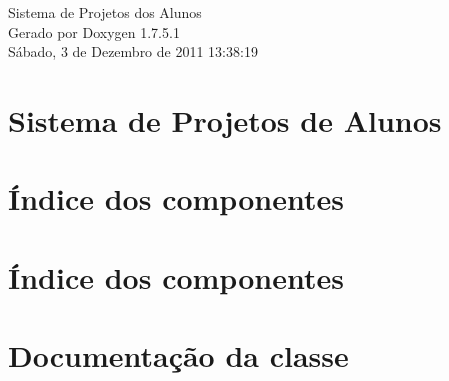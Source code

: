 \documentclass[a4paper]{book}
\begin{document}
\hypersetup{pageanchor=false,citecolor=blue}
\begin{titlepage}
\vspace*{7cm}
\begin{center}
{\Large \-Sistema de \-Projetos dos \-Alunos }\\
\vspace*{1cm}
{\large \-Gerado por Doxygen 1.7.5.1}\\
\vspace*{0.5cm}
{\small Sábado, 3 de Dezembro de 2011 13:38:19}\\
\end{center}
\end{titlepage}
\clearemptydoublepage
{}
\tableofcontents
\clearemptydoublepage
{}
\hypersetup{pageanchor=true,citecolor=blue}
\chapter{\-Sistema de \-Projetos de \-Alunos}
\label{index}\hypertarget{index}{}
\chapter{Índice dos componentes}

\chapter{Índice dos componentes}

\chapter{\-Documentação da classe}
































\printindex
\end{document}
